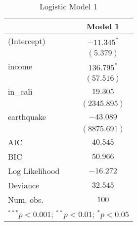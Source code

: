 
\begin{table}
\begin{center}
\begin{tabular}{l c}
\hline
 & Model 1 \\
\hline
(Intercept)    & $-11.345^{*}$ \\
               & $(5.379)$     \\
income         & $136.795^{*}$ \\
               & $(57.516)$    \\
in\_cali       & $19.305$      \\
               & $(2345.895)$  \\
earthquake     & $-43.089$     \\
               & $(8875.691)$  \\
\hline
AIC            & $40.545$      \\
BIC            & $50.966$      \\
Log Likelihood & $-16.272$     \\
Deviance       & $32.545$      \\
Num. obs.      & $100$         \\
\hline
\multicolumn{2}{l}{\scriptsize{$^{***}p<0.001$; $^{**}p<0.01$; $^{*}p<0.05$}}
\end{tabular}
\caption{Logistic Model 1}
\label{tab:logit_model_1}
\end{center}
\end{table}
